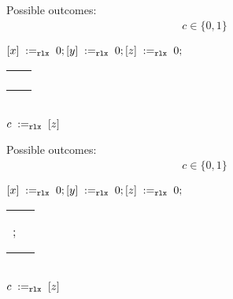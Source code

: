 \begin{minipage}[t]{0.3\linewidth}
Possible outcomes:\\
\[\begin{array}{l}
  c \in \{0, 1\}
\end{array}\]
\end{minipage}
%
\codePrefix
  $[x] \;:=_{\mathtt{rlx}}\;0;
  [y] \;:=_{\mathtt{rlx}}\;0;
  [z] \;:=_{\mathtt{rlx}}\;0;$ \\
  \begin{tabular}{L || L}
    \begin{array}{@{}l@{}}
      ; \\
    \end{array} &

    \begin{array}{@{}l@{}}
      ; \\
    \end{array}
  \end{tabular} \\
  $c \;:=_{\mathtt{rlx}}\;[z]$
\codePostfix
\litmusTestEnd

\begin{minipage}[t]{0.3\linewidth}
Possible outcomes:\\
\[\begin{array}{l}
  c \in \{0, 1\}
\end{array}\]
\end{minipage}
%
\codePrefix
  $[x] \;:=_{\mathtt{rlx}}\;0;
  [y] \;:=_{\mathtt{rlx}}\;0;
  [z] \;:=_{\mathtt{rlx}}\;0;$ \\
  \begin{tabular}{L || L}
    \begin{array}{@{}l@{}}
      ; \\
    \end{array} &

    \begin{array}{@{}l@{}}
      ; \\
    \end{array}
  \end{tabular} \\
  $c \;:=_{\mathtt{rlx}}\;[z]$
\codePostfix
\litmusTestEnd

